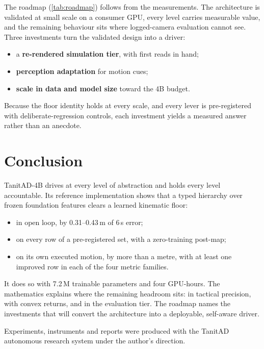 \documentclass[10pt,twocolumn]{article}
\makeatletter
\theoremstyle{remark}
\renewcommand\paragraph{\@startsection{paragraph}{4}{\z@}{1.6ex \@plus .5ex \@minus .2ex}{-1em}{\normalfont\normalsize\bfseries}}
\makeatother
\begin{document}
The roadmap (\cref{tab:roadmap}) follows from the measurements. The architecture is validated at small scale on a consumer GPU,
every level carries measurable value, and the remaining behaviour sits where logged-camera evaluation cannot see. Three investments
turn the validated design into a driver:
\begin{itemize}
  \item a \textbf{re-rendered simulation tier}, with first reads in hand;
  \item \textbf{perception adaptation} for motion cues;
  \item \textbf{scale in data and model size} toward the 4B budget.
\end{itemize}
Because the floor identity holds at every scale, and every lever is pre-registered with deliberate-regression controls, each
investment yields a measured answer rather than an anecdote.

\section{Conclusion}
TanitAD-4B drives at every level of abstraction and holds every level accountable. Its reference implementation shows that a typed
hierarchy over frozen foundation features clears a learned kinematic floor:
\begin{itemize}
  \item in open loop, by 0.31--0.43\,m of 6\,s error;
  \item on every row of a pre-registered set, with a zero-training post-map;
  \item on its own executed motion, by more than a metre, with at least one improved row in each of the four metric families.
\end{itemize}
It does so with 7.2\,M trainable parameters and four GPU-hours. The mathematics explains where the remaining headroom sits: in
tactical precision, with convex returns, and in the evaluation tier. The roadmap names the investments that will convert the
architecture into a deployable, self-aware driver.

\paragraph{Acknowledgements.} Experiments, instruments and reports were produced with the TanitAD autonomous research system under
the author's direction.
\end{document}
